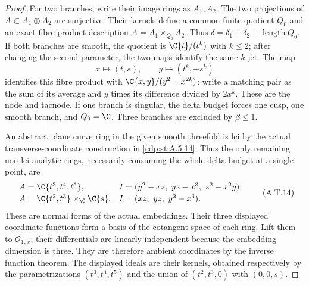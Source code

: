 \begin{proof}
For two branches, write their image rings as $A_1,A_2$.
The two projections of $A\subset A_1\oplus A_2$ are
surjective. Their kernels define a common finite
quotient $Q_0$ and an exact fibre-product description
$A=A_1\times_{Q_0}A_2$. Thus
$\delta=\delta_1+\delta_2+\operatorname{length}Q_0$.
If both branches are smooth, the quotient is
$\C\{t\}/(t^k)$ with $k\le2$; after changing the
second parameter, the two maps identify the same
$k$-jet. The map
\[
 x\longmapsto(t,s),\qquad
 y\longmapsto(t^k,-s^k)
\]
identifies this fibre product with
$\C\{x,y\}/(y^2-x^{2k})$: write a matching pair as
the sum of its average and $y$ times its difference
divided by $2x^k$. These are the node and tacnode.
If one branch is singular, the delta budget forces
one cusp, one smooth branch, and $Q_0=\C$.
Three branches are excluded by $\beta\le1$.

An abstract plane curve ring in the given smooth
threefold is lci by the actual transverse-coordinate
construction in \ref{cdp:st:A.5.14}. Thus the only remaining
non-lci analytic rings, necessarily consuming the
whole delta budget at a single point, are
\[
\begin{array}{ll}
 A=\C\{t^3,t^4,t^5\},
 &I=(y^2-xz,\ yz-x^3,\ z^2-x^2y),\\[2pt]
 A=\C\{t^2,t^3\}\times_{\C}\C\{s\},
 &I=(xz,\ yz,\ y^2-x^3).
\end{array}                                             \tag{A.T.14}\label{cdp:eq:A.T.14}
\]
These are normal forms of the actual embeddings.
Their three displayed coordinate functions form a
basis of the cotangent space of each ring. Lift them
to $\mathcal O_{Y,x}$; their differentials are linearly
independent because the embedding dimension is three.
They are therefore ambient coordinates by the inverse
function theorem. The displayed ideals are their
kernels, obtained respectively by the parametrizations
$(t^3,t^4,t^5)$ and the union of $(t^2,t^3,0)$ with
$(0,0,s)$.


\end{proof}
